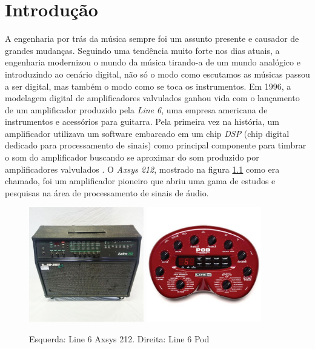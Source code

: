 \chapter[Introdução]{Introdução}


A engenharia por trás da música sempre foi um assunto presente e causador de grandes mudanças. Seguindo uma tendência muito forte nos dias atuais, a engenharia modernizou o mundo da música tirando-a de um mundo analógico e introduzindo ao cenário digital, não só o modo como escutamos as músicas passou a ser digital, mas também o modo como se toca os instrumentos. Em 1996, a modelagem digital de amplificadores valvulados ganhou vida com o lançamento de um amplificador produzido pela \textit{Line 6}, uma empresa americana de instrumentos e acessórios para guitarra. Pela primeira vez na história, um amplificador utilizava um software embarcado em um chip \textit{DSP} (chip digital dedicado para processamento de sinais) como principal componente para timbrar o som do amplificador buscando se aproximar do som produzido por amplificadores valvulados \cite{paulwhite_line6_line6_line6_2006}. O \textit{Axsys 212}, mostrado na figura \ref{fig1} como era chamado, foi um amplificador pioneiro que abriu uma gama de estudos e pesquisas na área de processamento de sinais de áudio.
\begin{figure}[!htb]
	\centering
	{
		\includegraphics[height=5cm]{figuras/Axsys212}
		\label{Axsys 212}
	}
	\quad %
	{
		\includegraphics[height=5cm]{figuras/Pod}
		\label{Pod}
	}
	
	\caption{Esquerda: Line 6 Axsys 212. Direita: Line 6 Pod }
	\label{fig1}
\end{figure}




